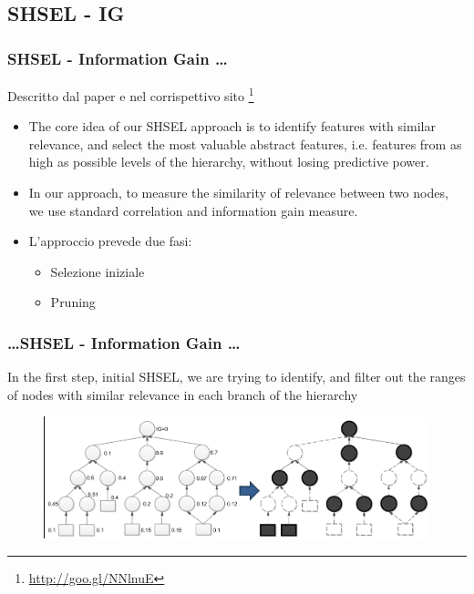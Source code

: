 \documentclass{beamer}
\begin{document}
\subsection{SHSEL - IG}
\begin{frame}
	\frametitle{SHSEL - Information Gain \dots}
	Descritto dal paper \cite{ristoski2014feature} e nel corrispettivo sito \footnote{\url{http://goo.gl/NNlnuE}}
	\begin{itemize}
		\item The core idea of our SHSEL approach is to identify features with similar relevance, and select the most valuable abstract features, i.e. features from as high as possible levels of the hierarchy, without losing predictive power.
		\item In our approach, to measure the similarity of relevance between two nodes, we use standard correlation and information gain measure.
	\item L'approccio prevede due fasi:
	\begin{itemize}
		\item Selezione iniziale
		\item Pruning
	\end{itemize}
	\end{itemize}
\end{frame}

\begin{frame}
	\frametitle{\dots SHSEL - Information Gain \dots}
	In the first step, initial SHSEL, we are trying to identify, and filter out the ranges of nodes with similar relevance in each branch of the hierarchy
	\begin{figure}[tbph]
		\centering
		\includegraphics[width=1\linewidth]{figure/Mannheim/SHSEL_Phase1.png}
		\label{fig:SHSELPhase1}
	\end{figure}
\end{frame}
\end{document}
